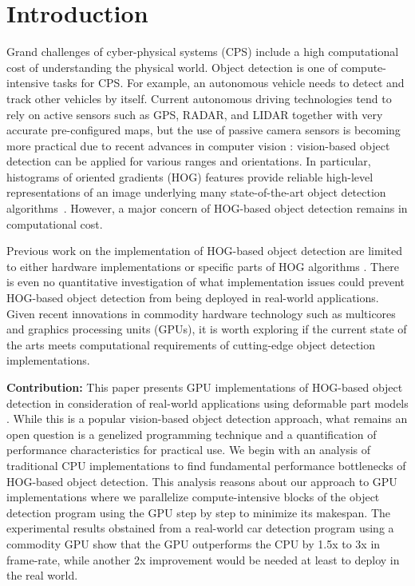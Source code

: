 \section{Introduction}
\label{sec:introduction}

Grand challenges of cyber-physical systems (CPS) include a high
computational cost of understanding the physical world.
Object detection is one of compute-intensive tasks for CPS.
For example, an autonomous vehicle needs to detect and track other
vehicles by itself.
Current autonomous driving technologies \cite{Guizzo11, Levinson11,
Urmson08} tend to rely on active sensors such as GPS, RADAR, and LIDAR
\cite{Kirchner00, Streller02} together with very accurate pre-configured
maps, but the use of passive camera sensors is becoming more practical
due to recent advances in computer vision \cite{Dalal05, Felzenszwalb05,
Felzenszwalb10}: vision-based object detection can be applied for
various ranges and orientations.
In particular, histograms of oriented gradients (HOG) \cite{Dalal05}
features provide reliable high-level representations of an image
underlying many state-of-the-art object detection
algorithms~\cite{Felzenszwalb10, Geiger12, Rybski10, Suard06, Zhu06}.
However, a major concern of HOG-based object detection remains in
computational cost.

Previous work on the implementation of HOG-based object detection are
limited to either hardware implementations \cite{Kadota09, Karakaya09,
Komorkiewicz12} or specific parts of HOG algorithms \cite{Chen11,
Prisacariu09}.
There is even no quantitative investigation of what implementation
issues could prevent HOG-based object detection from being deployed in
real-world applications.
Given recent innovations in commodity hardware technology such as
multicores and graphics processing units (GPUs), it is worth
exploring if the current state of the arts meets computational
requirements of cutting-edge object detection implementations.

\textbf{Contribution:}
This paper presents GPU implementations of HOG-based object detection in
consideration of real-world applications using deformable part models
\cite{Felzenszwalb10}.
While this is a popular vision-based object detection approach, what
remains an open question is a genelized programming technique and a
quantification of performance characteristics for practical use.
We begin with an analysis of traditional CPU
implementations to find fundamental performance bottlenecks of HOG-based
object detection.
This analysis reasons about our approach to GPU implementations where we
parallelize compute-intensive blocks of the object detection program
using the GPU step by step to minimize its makespan.
The experimental results obstained from a real-world car detection
program using a commodity GPU show that the GPU outperforms the CPU by
1.5x to 3x in frame-rate, while another 2x improvement would be needed
at least to deploy in the real world.

